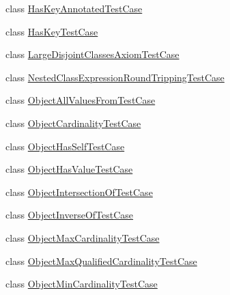 \begin{DoxyCompactItemize}
class \hyperlink{classorg_1_1semanticweb_1_1owlapi_1_1api_1_1test_1_1classexpressions_1_1_has_key_annotated_test_case}{Has\-Key\-Annotated\-Test\-Case}
\item 
class \hyperlink{classorg_1_1semanticweb_1_1owlapi_1_1api_1_1test_1_1classexpressions_1_1_has_key_test_case}{Has\-Key\-Test\-Case}
\item 
class \hyperlink{classorg_1_1semanticweb_1_1owlapi_1_1api_1_1test_1_1classexpressions_1_1_large_disjoint_classes_axiom_test_case}{Large\-Disjoint\-Classes\-Axiom\-Test\-Case}
\item 
class \hyperlink{classorg_1_1semanticweb_1_1owlapi_1_1api_1_1test_1_1classexpressions_1_1_nested_class_expression_round_tripping_test_case}{Nested\-Class\-Expression\-Round\-Tripping\-Test\-Case}
\item 
class \hyperlink{classorg_1_1semanticweb_1_1owlapi_1_1api_1_1test_1_1classexpressions_1_1_object_all_values_from_test_case}{Object\-All\-Values\-From\-Test\-Case}
\item 
class \hyperlink{classorg_1_1semanticweb_1_1owlapi_1_1api_1_1test_1_1classexpressions_1_1_object_cardinality_test_case}{Object\-Cardinality\-Test\-Case}
\item 
class \hyperlink{classorg_1_1semanticweb_1_1owlapi_1_1api_1_1test_1_1classexpressions_1_1_object_has_self_test_case}{Object\-Has\-Self\-Test\-Case}
\item 
class \hyperlink{classorg_1_1semanticweb_1_1owlapi_1_1api_1_1test_1_1classexpressions_1_1_object_has_value_test_case}{Object\-Has\-Value\-Test\-Case}
\item 
class \hyperlink{classorg_1_1semanticweb_1_1owlapi_1_1api_1_1test_1_1classexpressions_1_1_object_intersection_of_test_case}{Object\-Intersection\-Of\-Test\-Case}
\item 
class \hyperlink{classorg_1_1semanticweb_1_1owlapi_1_1api_1_1test_1_1classexpressions_1_1_object_inverse_of_test_case}{Object\-Inverse\-Of\-Test\-Case}
\item 
class \hyperlink{classorg_1_1semanticweb_1_1owlapi_1_1api_1_1test_1_1classexpressions_1_1_object_max_cardinality_test_case}{Object\-Max\-Cardinality\-Test\-Case}
\item 
class \hyperlink{classorg_1_1semanticweb_1_1owlapi_1_1api_1_1test_1_1classexpressions_1_1_object_max_qualified_cardinality_test_case}{Object\-Max\-Qualified\-Cardinality\-Test\-Case}
\item 
class \hyperlink{classorg_1_1semanticweb_1_1owlapi_1_1api_1_1test_1_1classexpressions_1_1_object_min_cardinality_test_case}{Object\-Min\-Cardinality\-Test\-Case}

\end{DoxyCompactItemize}
